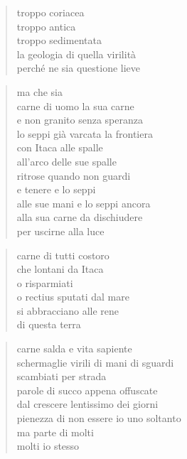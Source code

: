 	\begin{verse}
		troppo coriacea\\
		troppo antica\\
		troppo sedimentata\\
		la geologia di quella virilità\\
		perché ne sia questione lieve
	\end{verse}

	\begin{verse}
		ma che sia\\
		carne di uomo la sua carne\\
		e non granito senza speranza\\
		lo seppi già varcata la frontiera\\
		con Itaca alle spalle\\
		all’arco delle sue spalle\\
		ritrose quando non guardi\\
		e tenere e lo seppi\\
		alle sue mani e lo seppi ancora\\
		alla sua carne da dischiudere\\
		per uscirne alla luce
	\end{verse}


\clearpage



	\begin{verse}
		carne di tutti costoro\\
		che lontani da Itaca\\
		o risparmiati\\
		o rectius sputati dal mare\\
		si abbracciano alle rene\\
		di questa terra
	\end{verse}

	\begin{verse}
		carne salda e vita sapiente\\
		schermaglie virili di mani di sguardi\\
		scambiati per strada\\
		parole di succo appena offuscate\\
		dal crescere lentissimo dei giorni\\
		pienezza di non essere io uno soltanto\\
		ma parte di molti\\
		molti io stesso
	\end{verse}


